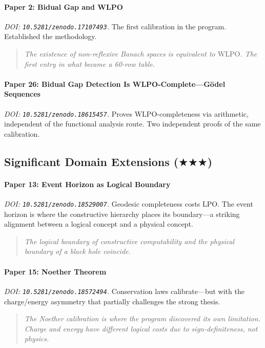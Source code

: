 \documentclass[11pt,a4paper]{report}
\theoremstyle{plain}
\theoremstyle{definition}
\theoremstyle{remark}
\newcommand{\WLPO}{\mathrm{WLPO}}
\newcommand{\LPO}{\mathrm{LPO}}
\newcommand{\ThreeStar}{$\bigstar\bigstar\bigstar$}
\begin{document}
\paragraph{Paper 2: Bidual Gap and WLPO}
\emph{DOI: \texttt{10.5281/zenodo.17107493}.}\quad
The first calibration in the program.  Established the methodology.
\begin{quote}\itshape
The existence of non-reflexive Banach spaces is equivalent to $\WLPO$.  The first entry in what became a 60-row table.
\end{quote}

\paragraph{Paper 26: Bidual Gap Detection Is WLPO-Complete---G\"odel Sequences}
\emph{DOI: \texttt{10.5281/zenodo.18615457}.}\quad
Proves $\WLPO$-completeness via arithmetic, independent of the functional analysis route.  Two independent proofs of the same calibration.

\subsection{Significant Domain Extensions {\normalfont(\ThreeStar)}}

\paragraph{Paper 13: Event Horizon as Logical Boundary}
\emph{DOI: \texttt{10.5281/zenodo.18529007}.}\quad
Geodesic completeness costs $\LPO$.  The event horizon is where the constructive hierarchy places its boundary---a striking alignment between a logical concept and a physical concept.
\begin{quote}\itshape
The logical boundary of constructive computability and the physical boundary of a black hole coincide.
\end{quote}

\paragraph{Paper 15: Noether Theorem}
\emph{DOI: \texttt{10.5281/zenodo.18572494}.}\quad
Conservation laws calibrate---but with the charge/energy asymmetry that partially challenges the strong thesis.
\begin{quote}\itshape
The Noether calibration is where the program discovered its own limitation.  Charge and energy have different logical costs due to sign-definiteness, not physics.
\end{quote}
\end{document}
